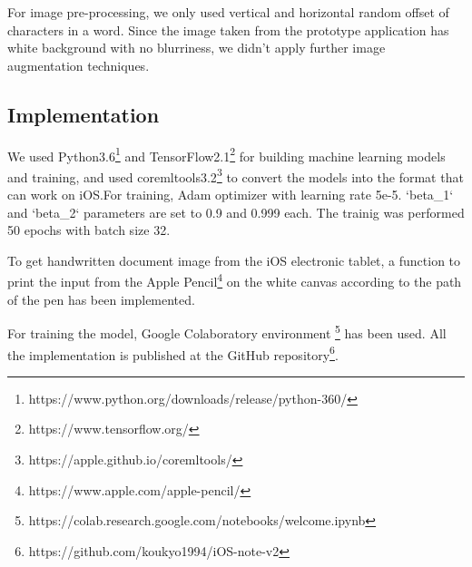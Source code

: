 For image pre-processing, we only used vertical and horizontal random offset of characters in a word.
Since the image taken from the prototype application has white background with no blurriness,
we didn't apply further image augmentation techniques.

\subsection{Implementation}

We used Python3.6\footnote{https://www.python.org/downloads/release/python-360/} and
TensorFlow2.1\footnote{https://www.tensorflow.org/} for building machine learning
models and training, and used coremltools3.2\footnote{https://apple.github.io/coremltools/}
to convert the models into the format that can work on iOS.For training,
Adam optimizer with learning rate 5e-5. `beta\_1` and `beta\_2` parameters are set to 0.9 and 0.999 each.
The trainig was performed 50 epochs with batch size 32.

To get handwritten document image from the iOS electronic tablet, a function to print
the input from the Apple Pencil\footnote{https://www.apple.com/apple-pencil/} on the white canvas
according to the path of the pen has been implemented.

For training the model, Google Colaboratory environment
\footnote{https://colab.research.google.com/notebooks/welcome.ipynb} has been used.
All the implementation is published at the GitHub repository\footnote{https://github.com/koukyo1994/iOS-note-v2}.
